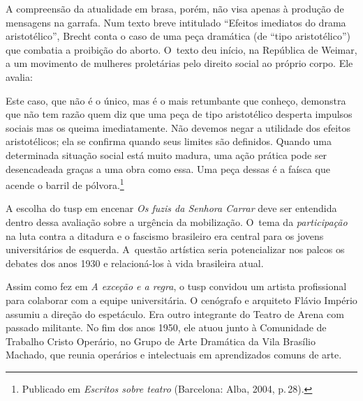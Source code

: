 {A compreensão da atualidade em brasa, porém, não visa apenas à produção
de mensagens na garrafa. Num texto breve intitulado “Efeitos imediatos
do drama aristotélico”, Brecht conta o caso de uma peça dramática (de
“tipo aristotélico”) que combatia a proibição do aborto. O~texto deu
início, na República de Weimar, a um movimento de mulheres proletárias
pelo direito social ao próprio corpo. Ele avalia:

\startblockquote
Este caso, que não é o único, mas é o mais retumbante que conheço,
demonstra que não tem razão quem diz que uma peça de tipo aristotélico
desperta impulsos sociais mas os queima imediatamente. Não devemos negar
a utilidade dos efeitos aristotélicos; ela se confirma quando seus
limites são definidos. Quando uma determinada situação social está muito
madura, uma ação prática pode ser desencadeada graças a uma obra como
essa. Uma peça dessas é a faísca que acende o barril de
pólvora.\footnote{Publicado em {\it Escritos sobre teatro} (Barcelona:
  Alba, 2004, p.\,28).}
\stopblockquote


A escolha do {\sc tusp} em encenar {\it Os fuzis da Senhora Carrar} deve ser
entendida dentro dessa avaliação sobre a urgência da mobilização. O~tema
da {\it participação} na luta contra a ditadura e o fascismo brasileiro
era central para os jovens universitários de esquerda. A~questão
artística seria potencializar nos palcos os debates dos anos 1930 e
relacioná-los à vida brasileira atual.

\subject{Formação da equipe}

Assim como fez em {\it A exceção e a regra}, o {\sc tusp} convidou um
artista profissional para colaborar com a equipe universitária. O
cenógrafo e arquiteto Flávio Império assumiu a direção do espetáculo.
Era outro integrante do Teatro de Arena com passado militante. No fim
dos anos 1950, ele atuou junto à Comunidade de Trabalho Cristo Operário,
no Grupo de Arte Dramática da Vila Brasílio Machado, que reunia
operários e intelectuais em aprendizados comuns de arte.

}
